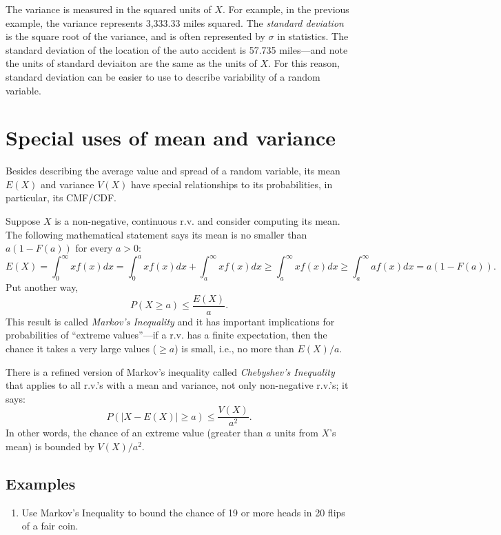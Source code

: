 \documentclass[]{book}
\providecommand{\tightlist}{%
  \setlength{\itemsep}{0pt}\setlength{\parskip}{0pt}}
\begin{document}
The variance is measured in the squared units of \(X\). For example, in
the previous example, the variance represents 3,333.33 miles squared.
The \emph{standard deviation} is the square root of the variance, and is
often represented by \(\sigma\) in statistics. The standard deviation of
the location of the auto accident is 57.735 miles---and note the units
of standard deviaiton are the same as the units of \(X\). For this
reason, standard deviation can be easier to use to describe variability
of a random variable.

\section{Special uses of mean and
variance}\label{special-uses-of-mean-and-variance}

Besides describing the average value and spread of a random variable,
its mean \(E(X)\) and variance \(V(X)\) have special relationships to
its probabilities, in particular, its CMF/CDF.

Suppose \(X\) is a non-negative, continuous r.v. and consider computing
its mean. The following mathematical statement says its mean is no
smaller than \(a(1-F(a))\) for every \(a >0\):
\[E(X) = \int_0^\infty xf(x)dx = \int_0^a xf(x)dx+\int_a^\infty xf(x)dx\geq \int_a^\infty xf(x)dx \geq \int_a^\infty af(x)dx = a(1-F(a)).\]
Put another way, \[P(X \geq a) \leq \frac{E(X)}{a}.\] This result is
called \emph{Markov's Inequality} and it has important implications for
probabilities of ``extreme values''---if a r.v. has a finite
expectation, then the chance it takes a very large values (\(\geq a\))
is small, i.e., no more than \(E(X)/a\).

There is a refined version of Markov's inequality called
\emph{Chebyshev's Inequality} that applies to all r.v.'s with a mean and
variance, not only non-negative r.v.'s; it says:
\[P(|X - E(X)| \geq a) \leq \frac{V(X)}{a^2}.\] In other words, the
chance of an extreme value (greater than \(a\) units from \(X\)'s mean)
is bounded by \(V(X)/a^2\).

\subsection{Examples}\label{examples-2}

\begin{enumerate}
\def\labelenumi{\arabic{enumi}.}
\tightlist
\item
  Use Markov's Inequality to bound the chance of 19 or more heads in 20
  flips of a fair coin.
\end{enumerate}
\end{document}
